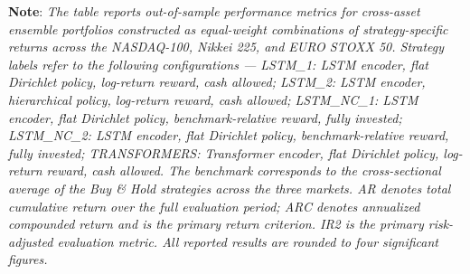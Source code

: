 \documentclass[]{elsarticle}
\begin{document}
\linespread{1.5}\selectfont

\begin{table}[H]
\centering
\small
\setlength{\tabcolsep}{3pt}
\renewcommand{\arraystretch}{1.1}
\caption{Performance Metrics for Ensemble Strategies}
\label{tab:perf_metric_ensemble}
\end{table}
\vspace{-0.4cm}
\noindent\linespread{0.65}\selectfont
{\scriptsize \textbf{Note}: \textit{The table reports out-of-sample performance metrics for cross-asset ensemble portfolios constructed as equal-weight combinations of strategy-specific returns across the NASDAQ-100, Nikkei 225, and EURO STOXX 50. Strategy labels refer to the following configurations --- LSTM\_1: LSTM encoder, flat Dirichlet policy, log-return reward, cash allowed; LSTM\_2: LSTM encoder, hierarchical policy, log-return reward, cash allowed; LSTM\_NC\_1: LSTM encoder, flat Dirichlet policy, benchmark-relative reward, fully invested; LSTM\_NC\_2: LSTM encoder, flat Dirichlet policy, benchmark-relative reward, fully invested; TRANSFORMERS: Transformer encoder, flat Dirichlet policy, log-return reward, cash allowed. The benchmark corresponds to the cross-sectional average of the Buy \& Hold strategies across the three markets. AR denotes total cumulative return over the full evaluation period; ARC denotes annualized compounded return and is the primary return criterion. IR2 is the primary risk-adjusted evaluation metric. All reported results are rounded to four significant figures.}}
\end{document}
